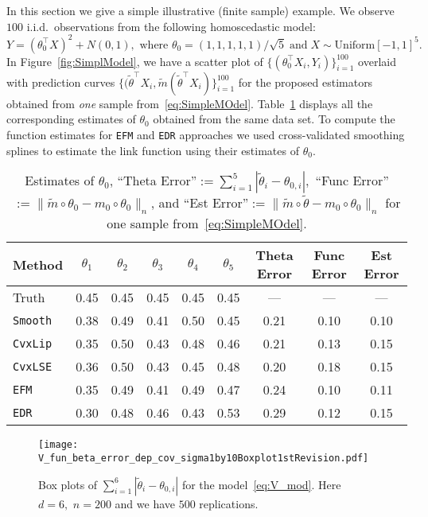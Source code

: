 In this section we give a simple illustrative (finite sample) example. We observe $100$ i.i.d.~observations from the following homoscedastic model:
\begin{equation}\label{eq:SimpleMOdel}
Y=(\theta_0^\top X)^2+ N(0,1),\text{ where }\theta_0=(1,1,1,1,1)/\sqrt{5}\;\text{and}\; X\sim\text{Uniform}[-1,1]^5.
\end{equation}
In Figure~\ref{fig:SimplModel}, we have a scatter plot of $\{(\theta_0^\top X_i,Y_i)\}_{ i=1}^{ 100}$ overlaid with prediction curves $\{(\tilde{\theta}^\top X_i,\tilde{m}( \tilde{\theta}^\top X_i)\}_{ i=1}^{ 100}$ for the proposed estimators obtained from \textit{one} sample from~\eqref{eq:SimpleMOdel}. Table~\ref{tab:theta_SimplModel} displays all the corresponding estimates of $\theta_0$ obtained from the same data set. To compute the function estimates for \texttt{EFM} and \texttt{EDR} approaches we used cross-validated smoothing splines to estimate the link function using their estimates of $\theta_0$.

\begin{table}[!ht]
\caption[Estimates of $\theta_0$ for a simple model]{\label{tab:theta_SimplModel}Estimates of $\theta_0$, ``Theta Error''$:=\sum_{i=1}^5 |\tilde{\theta}_i-\theta_{0,i}|,$  ``Func Error''$:=\|\tilde{m}\circ \theta_0-m_0\circ\theta_0\|_n$, and { ``Est Error''}$:=\|\tilde{m}\circ \tilde{\theta}-m_0\circ\theta_0\|_n$ for one sample from~\eqref{eq:SimpleMOdel}.}
\centering
\begin{tabular}{lcccccccc}
  \toprule
Method & $\theta_1$ & $\theta_2$ & $\theta_3$ & $\theta_4$ & $\theta_5$ & Theta Error & Func Error & Est Error \\
  \midrule
Truth & 0.45 & 0.45 & 0.45 & 0.45 & 0.45 & --- & --- & --- \\
  \texttt{Smooth} & 0.38 & 0.49 & 0.41 & 0.50 & 0.45 & 0.21 & 0.10 & 0.10 \\
  \texttt{CvxLip} & 0.35 & 0.50 & 0.43 & 0.48 & 0.46 & 0.21 & 0.13 & 0.15 \\
  \texttt{CvxLSE} & 0.36 & 0.50 & 0.43 & 0.45 & 0.48 & 0.20 & 0.18 & 0.15 \\
  \texttt{EFM} & 0.35 & 0.49 & 0.41 & 0.49 & 0.47 & 0.24 & 0.10 & 0.11 \\
  \texttt{EDR} & 0.30 & 0.48 & 0.46 & 0.43 & 0.53 & 0.29 & 0.12 & 0.15 \\
   \bottomrule
\end{tabular}
\end{table}
\begin{figure}[!ht]
\centering
\texttt{[image: V\_fun\_beta\_error\_dep\_cov\_sigma1by10Boxplot1stRevision.pdf]}\\ %
\caption[Boxplots of estimates when the truth is a piecewise affine convex function]{Box plots of $\sum_{i=1}^6|\tilde{\theta}_i-\theta_{0,i}|$ for the model~\eqref{eq:V_mod}. Here $d=6,$ $n=200$ and we have $500$ replications.}
\label{fig:LiPatilea15}

\end{figure}
